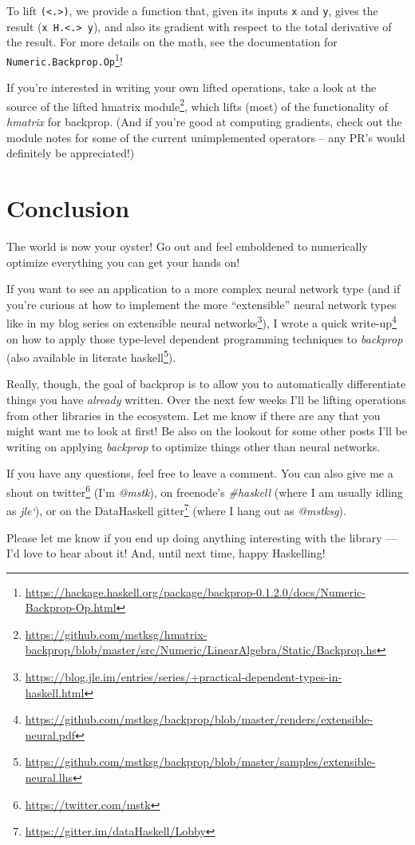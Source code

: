\documentclass[]{article}
\renewcommand{\href}[2]{#2\footnote{\url{#1}}}
\begin{document}
To lift \texttt{(\textless{}.\textgreater{})}, we provide a function that, given
its inputs \texttt{x} and \texttt{y}, gives the result
(\texttt{x\ H.\textless{}.\textgreater{}\ y}), and also its gradient with
respect to the total derivative of the result. For more details on the math, see
the
\href{https://hackage.haskell.org/package/backprop-0.1.2.0/docs/Numeric-Backprop-Op.html}{documentation
for \texttt{Numeric.Backprop.Op}}!

If you're interested in writing your own lifted operations, take a look at the
\href{https://github.com/mstksg/hmatrix-backprop/blob/master/src/Numeric/LinearAlgebra/Static/Backprop.hs}{source
of the lifted hmatrix module}, which lifts (most) of the functionality of
\emph{hmatrix} for backprop. (And if you're good at computing gradients, check
out the module notes for some of the current unimplemented operators -- any PR's
would definitely be appreciated!)

\hypertarget{conclusion}{%
\section{Conclusion}\label{conclusion}}

The world is now your oyster! Go out and feel emboldened to numerically optimize
everything you can get your hands on!

If you want to see an application to a more complex neural network type (and if
you're curious at how to implement the more ``extensible'' neural network types
like in my
\href{https://blog.jle.im/entries/series/+practical-dependent-types-in-haskell.html}{blog
series on extensible neural networks}), I wrote
\href{https://github.com/mstksg/backprop/blob/master/renders/extensible-neural.pdf}{a
quick write-up} on how to apply those type-level dependent programming
techniques to \emph{backprop} (also available in
\href{https://github.com/mstksg/backprop/blob/master/samples/extensible-neural.lhs}{literate
haskell}).

Really, though, the goal of backprop is to allow you to automatically
differentiate things you have \emph{already} written. Over the next few weeks
I'll be lifting operations from other libraries in the ecosystem. Let me know if
there are any that you might want me to look at first! Be also on the lookout
for some other posts I'll be writing on applying \emph{backprop} to optimize
things other than neural networks.

If you have any questions, feel free to leave a comment. You can also give me a
shout on \href{https://twitter.com/mstk}{twitter} (I'm \emph{@mstk}), on
freenode's \emph{\#haskell} (where I am usually idling as \emph{jle`}), or on
the \href{https://gitter.im/dataHaskell/Lobby}{DataHaskell gitter} (where I hang
out as \emph{@mstksg}).

Please let me know if you end up doing anything interesting with the library ---
I'd love to hear about it! And, until next time, happy Haskelling!
\end{document}

